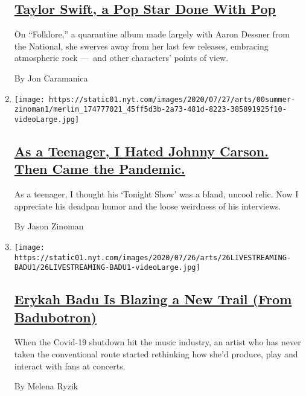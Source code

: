 \begin{enumerate}
{  \subsection{\texorpdfstring{\href{/2020/07/26/arts/music/taylor-swift-folklore-review.html}{Taylor
  Swift, a Pop Star Done With
  Pop}}{Taylor Swift, a Pop Star Done With Pop}}\label{taylor-swift-a-pop-star-done-with-pop}}

  On ``Folklore,'' a quarantine album made largely with Aaron Dessner
  from the National, she swerves away from her last few releases,
  embracing atmospheric rock ---~and other characters' points of view.

  By Jon Caramanica
\item
  \texttt{[image: https://static01.nyt.com/images/2020/07/27/arts/00summer-zinoman1/merlin\_174777021\_45ff5d3b-2a73-481d-8223-385891925f10-videoLarge.jpg]}

  \hypertarget{as-a-teenager-i-hated-johnny-carson-then-came-the-pandemic}{%
  \subsection{\texorpdfstring{\href{/2020/07/26/arts/television/johnny-carson-tonight-show.html}{As
  a Teenager, I Hated Johnny Carson. Then Came the
  Pandemic.}}{As a Teenager, I Hated Johnny Carson. Then Came the Pandemic.}}\label{as-a-teenager-i-hated-johnny-carson-then-came-the-pandemic}}

  As a teenager, I thought his `Tonight Show' was a bland, uncool relic.
  Now I appreciate his deadpan humor and the loose weirdness of his
  interviews.

  By Jason Zinoman
\item
  \texttt{[image: https://static01.nyt.com/images/2020/07/26/arts/26LIVESTREAMING-BADU1/26LIVESTREAMING-BADU1-videoLarge.jpg]}

  \hypertarget{erykah-badu-is-blazing-a-new-trail-from-badubotron}{%
  \subsection{\texorpdfstring{\href{/2020/07/21/arts/music/erykah-badu-livestreams.html}{Erykah
  Badu Is Blazing a New Trail (From
  Badubotron)}}{Erykah Badu Is Blazing a New Trail (From Badubotron)}}\label{erykah-badu-is-blazing-a-new-trail-from-badubotron}}

  When the Covid-19 shutdown hit the music industry, an artist who has
  never taken the conventional route started rethinking how she'd
  produce, play and interact with fans at concerts.

  By Melena Ryzik
\end{enumerate}

